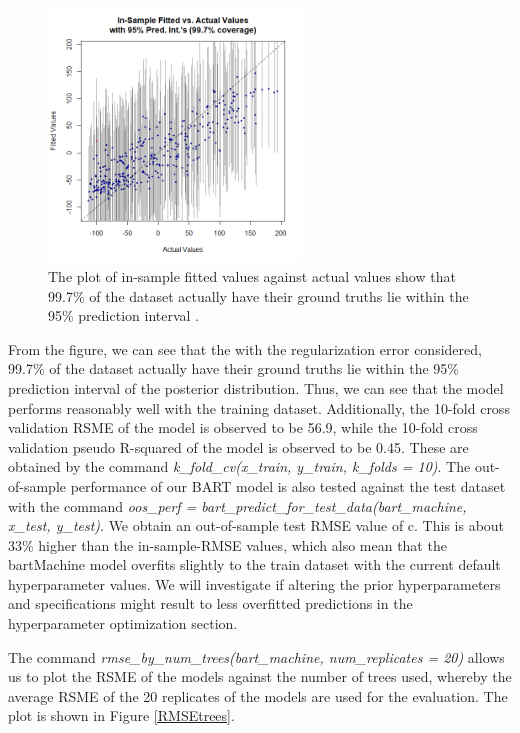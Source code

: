 \documentclass{usiinftr}
\begin{document}
\begin{figure}[h!] 
\centering
\includegraphics[width=0.6\textwidth]{images/PI.png}
\caption{The plot of in-sample fitted values against actual values show that 99.7\% of the dataset actually have their ground truths lie within the 95\% prediction interval .}
\label{PI}
\end{figure}

From the figure, we can see that the with the regularization error considered, 99.7\% of the dataset actually have their ground truths lie within the 95\% prediction interval of the posterior distribution. Thus, we can see that the model performs reasonably well with the training dataset. Additionally, the 10-fold cross validation RSME of the model is observed to be 56.9, while the 10-fold cross validation pseudo R-squared of the model is observed to be 0.45. These are obtained by the command \textit{k\_fold\_cv(x\_train, y\_train, k\_folds = 10)}. The out-of-sample performance of our BART model is also tested against the test dataset with the command \textit{oos\_perf = bart\_predict\_for\_test\_data(bart\_machine, x\_test, y\_test)}. We obtain an out-of-sample test RMSE value of c. This is about 33\% higher than the in-sample-RMSE values, which also mean that the bartMachine model overfits slightly to the train dataset with the current default hyperparameter values. We will investigate if altering the prior hyperparameters and specifications might result to less overfitted predictions in the hyperparameter optimization section.


The command \textit{rmse\_by\_num\_trees(bart\_machine, num\_replicates = 20)} allows us to plot the RSME of the models against the number of trees used, whereby the average RSME of the 20 replicates of the models are used for the evaluation. The plot is shown in Figure \ref{RMSEtrees}.
\end{document}
